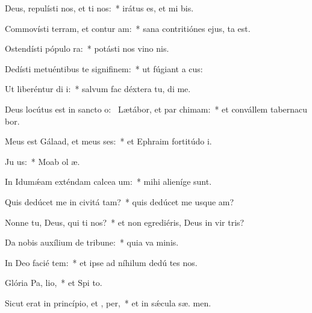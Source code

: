 \item Deus, repulísti nos, et ti nos:~* irátus es, et mi  bis.
\item Commovísti terram, et contur am:~* sana contritiónes ejus,  ta est.
\item Ostendísti pópulo  ra:~* potásti nos vino nis.
\item Dedísti metuéntibus te signifinem:~* ut fúgiant a  cus:
\item Ut liberéntur di i:~* salvum fac déxtera tu,  di me.
\item Deus locútus est in sancto o:~\pscross{} Lætábor, et par chimam:~* et convállem tabernacu bor.
\item Meus est Gálaad, et meus  ses:~* et Ephraim fortitúdo  i.
\item Ju  us:~* Moab ol  æ.
\item In Idumǽam exténdam calcea um:~* mihi alieníge  sunt.
\item Quis dedúcet me in civitá tam?~* quis dedúcet me usque  am?
\item Nonne tu, Deus, qui ti nos?~* et non egrediéris, Deus in vir tris?
\item Da nobis auxílium de tribune:~* quia va  minis.
\item In Deo facié tem:~* et ipse ad níhilum dedú tes nos.
\item Glória Pa,  lio,~* et Spi to.
\item Sicut erat in princípio, et ,  per,~* et in sǽcula sæ. men.
